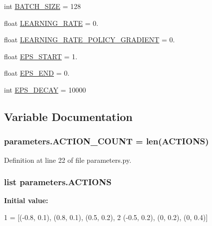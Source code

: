 \begin{DoxyCompactItemize}
\item 
int \hyperlink{namespaceparameters_a2d37d9950f7a887014021ab455282af6}{B\+A\+T\+C\+H\+\_\+\+S\+I\+ZE} = 128
\item 
float \hyperlink{namespaceparameters_afb996d542e8c3d3e8bbdfe4a711694dd}{L\+E\+A\+R\+N\+I\+N\+G\+\_\+\+R\+A\+TE} = 0.
\item 
float \hyperlink{namespaceparameters_aee9255eaabb90fcbf5ba1451159d8279}{L\+E\+A\+R\+N\+I\+N\+G\+\_\+\+R\+A\+T\+E\+\_\+\+P\+O\+L\+I\+C\+Y\+\_\+\+G\+R\+A\+D\+I\+E\+NT} = 0.
\item 
float \hyperlink{namespaceparameters_a371d0de003e9046dcc72450b7512ce14}{E\+P\+S\+\_\+\+S\+T\+A\+RT} = 1.
\item 
float \hyperlink{namespaceparameters_a3765f189d3af4815766ded3bffcba1e2}{E\+P\+S\+\_\+\+E\+ND} = 0.
\item 
int \hyperlink{namespaceparameters_ab9a88c663385563b35331bbea5c4a74b}{E\+P\+S\+\_\+\+D\+E\+C\+AY} = 10000
\end{DoxyCompactItemize}


\subsection{Variable Documentation}
\subsubsection[{\texorpdfstring{A\+C\+T\+I\+O\+N\+\_\+\+C\+O\+U\+NT}{ACTION_COUNT}}]{\setlength{\rightskip}{0pt plus 5cm}parameters.\+A\+C\+T\+I\+O\+N\+\_\+\+C\+O\+U\+NT = len({\bf A\+C\+T\+I\+O\+NS})}\hypertarget{namespaceparameters_ae4be13f6dac91f471da3efb4618a54c1}{}\label{namespaceparameters_ae4be13f6dac91f471da3efb4618a54c1}


Definition at line 22 of file parameters.\+py.

\subsubsection[{\texorpdfstring{A\+C\+T\+I\+O\+NS}{ACTIONS}}]{\setlength{\rightskip}{0pt plus 5cm}list parameters.\+A\+C\+T\+I\+O\+NS}\hypertarget{namespaceparameters_a585a25d0a26bcab4242d2e3fb1c1f93e}{}\label{namespaceparameters_a585a25d0a26bcab4242d2e3fb1c1f93e}
{\bfseries Initial value\+:}
\begin{DoxyCode}
1 = [(-0.8, 0.1), (0.8, 0.1), (0.5, 0.2),
2            (-0.5, 0.2), (0, 0.2), (0, 0.4)]
\end{DoxyCode}


